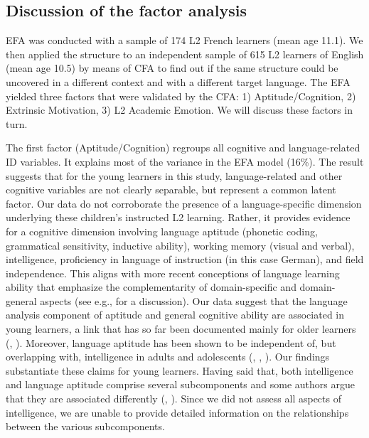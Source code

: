 \documentclass[output=paper]{langsci/langscibook}
\begin{document}
\subsection{Discussion of the factor analysis}\label{sec:03:3.3}

EFA was conducted with a sample of 174 L2 French learners (mean age 11.1). We then applied the structure to an independent sample of 615 L2 learners of English (mean age 10.5) by means of CFA to find out if the same structure could be uncovered in a different context and with a different target language. The EFA yielded three factors that were validated by the CFA: 1) Aptitude/Cognition, 2) Extrinsic Motivation, 3) L2 Academic Emotion. We will discuss these factors in turn.

The first factor (Aptitude/Cognition) regroups all cognitive and language-re\-lat\-ed ID variables. It explains most of the variance in the EFA model (16\%). The result suggests that for the young learners in this study, language-re\-lat\-ed and other cognitive variables are not clearly separable, but represent a common latent factor. Our data do not corroborate the presence of a language-specific dimension underlying these children’s instructed L2 learning. Rather, it provides evidence for a cognitive dimension involving language aptitude (phonetic coding, grammatical sensitivity, inductive ability), working memory (visual and verbal), intelligence, proficiency in language of instruction (in this case German), and field independence. This aligns with more recent conceptions of language learning ability that emphasize the complementarity of domain-specific and domain-general aspects (see e.g., \citealt{Skehan2019} for a discussion). Our data suggest that the language analysis component of aptitude and general cognitive ability are associated in young learners, a link that has so far been documented mainly for older learners (\citealt{Granena2012,Granena2012}, \citealt{Sasaki1996}). Moreover, language aptitude has been shown to be independent of, but overlapping with, intelligence in adults and adolescents (\citealt{WescheEtAl1982}, \citealt{Sasaki1996}, \citealt[827]{Li2016}). Our findings substantiate these claims for young learners. Having said that, both intelligence and language aptitude comprise several subcomponents and some authors argue that they are associated differently (\citealt{Granena2013}, \citealt{Li2016}). Since we did not assess all aspects of intelligence, we are unable to provide detailed information on the relationships between the various subcomponents.
\end{document}
